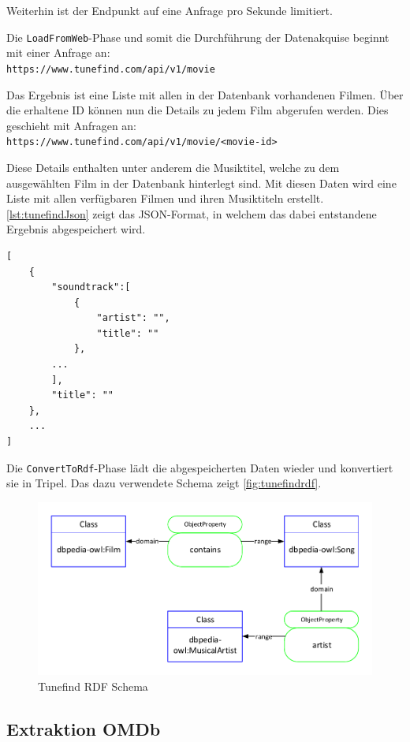 \documentclass[parskip]{scrartcl}
\begin{document}
Weiterhin ist der Endpunkt auf eine Anfrage pro Sekunde limitiert.

Die \texttt{LoadFromWeb}-Phase und somit die Durchführung der Datenakquise beginnt mit einer Anfrage an:\\
\texttt{https://www.tunefind.com/api/v1/movie}

Das Ergebnis ist eine Liste mit allen in der Datenbank vorhandenen Filmen. Über die erhaltene ID können nun die Details zu jedem Film abgerufen werden. Dies geschieht mit Anfragen an:\\
\texttt{https://www.tunefind.com/api/v1/movie/<movie-id>}

Diese Details enthalten unter anderem die Musiktitel, welche zu dem ausgewählten Film in der Datenbank hinterlegt sind.
Mit diesen Daten wird eine Liste mit allen verfügbaren Filmen und ihren Musiktiteln erstellt. \autoref{lst:tunefindJson} zeigt das JSON-Format, in welchem das dabei entstandene Ergebnis abgespeichert wird.

\begin{lstlisting}[caption={Tunefind JSON-Format}, label={lst:tunefindJson}]
[  
    {  
        "soundtrack":[  
            {
                "artist": "",
                "title": ""
            },
        ...
        ],
        "title": ""
    },
    ...
]
\end{lstlisting}

Die \texttt{ConvertToRdf}-Phase lädt die abgespeicherten Daten wieder und konvertiert sie in Tripel. Das dazu verwendete Schema zeigt \autoref{fig:tunefindrdf}.

\begin{figure}[H]
    \centering
    \caption{Tunefind RDF Schema}
    \label{fig:tunefindrdf}
    \includegraphics[scale=0.8]{tunefind}
\end{figure}
\subsection{Extraktion OMDb}
\end{document}
